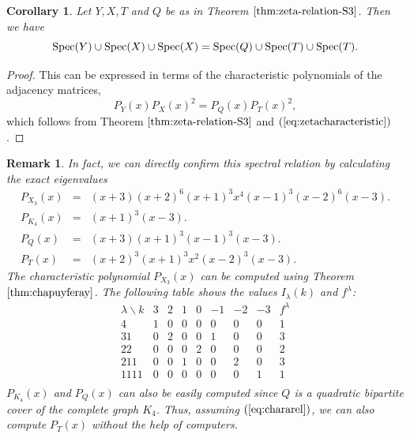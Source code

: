 \documentclass[lualatex,12pt]{article}
\newtheorem{cor}{Corollary}
\newtheorem{rmk}{Remark}
\begin{document}
\begin{cor}
 \label{cor:specrel}
Let $Y, X, T$ and $Q$ be as in Theorem $\ref{thm:zeta-relation-S3}$.
Then we have
\[
 {\rm Spec}(Y) \cup {\rm Spec}(X) \cup {\rm Spec}(X)
 = 
 {\rm Spec}(Q) \cup {\rm Spec}(T) \cup {\rm Spec}(T).
\]
\end{cor}
\begin{proof}
 This can be expressed in terms of the characteristic polynomials
 of the adjacency matrices,
\begin{equation}
 \label{eq:chararel}
 P_{Y}(x)P_{X}(x)^2 = P_{Q}(x) P_{T}(x)^2,
\end{equation}
which follows from Theorem $\ref{thm:zeta-relation-S3}$ and $(\ref{eq:zetacharacteristic})$.
\end{proof}

\begin{rmk}
In fact, we can directly confirm this spectral relation by calculating the exact eigenvalues
\begin{eqnarray*}
 P_{X_3}(x) & = &(x+3)(x+2)^6(x+1)^3x^4(x-1)^3(x-2)^6(x-3).\\
 P_{K_4}(x) & = &(x+1)^3(x-3). \\
 P_{Q}(x) & = & (x+3)(x+1)^3(x-1)^3(x-3).\\
 P_{T}(x) & = &(x+2)^3(x+1)^3x^2(x-2)^3(x-3).
\end{eqnarray*}
The characteristic polynomial $P_{X_3}(x)$ can be computed using Theorem $\ref{thm:chapuyferay}$.
The following table shows the values $I_\lambda(k)$ and $f^\lambda$:
\[
 \begin{array}{c||c|c|c|c|c|c|c||c}
  \lambda\backslash k & 3 & 2 & 1 & 0 & -1 & -2 & -3 & f^\lambda\\
  \hline
   4 & 1 & 0 & 0 & 0 & 0 & 0 & 0 & 1 \\
  \hline
  31 & 0 & 2 & 0 & 0 & 1 & 0 & 0 & 3\\ 
  \hline
   22 & 0 & 0 & 0 & 2 & 0 & 0 & 0 & 2 \\ 
  \hline
   211 & 0 & 0 & 1 & 0 & 0 & 2 & 0 & 3\\ 
  \hline
   1111 & 0 & 0 & 0 & 0 & 0 & 0 & 1 & 1\\ 
 \end{array}
\]
$P_{K_4}(x)$ and $P_Q(x)$ can also be easily computed since $Q$ is a quadratic
bipartite cover of the complete graph $K_4$.
Thus, assuming $(\ref{eq:chararel})$,
we can also compute $P_{T}(x)$ without the help of computers.
\end{rmk}
\end{document}
